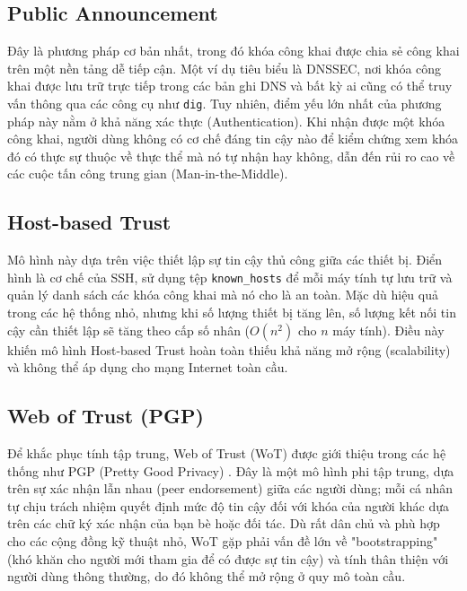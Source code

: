 \subsection{Public Announcement}
Đây là phương pháp cơ bản nhất, trong đó khóa công khai được chia sẻ công khai trên một nền tảng dễ tiếp cận. Một ví dụ tiêu biểu là DNSSEC, nơi khóa công khai được lưu trữ trực tiếp trong các bản ghi DNS và bất kỳ ai cũng có thể truy vấn thông qua các công cụ như \texttt{dig}. Tuy nhiên, điểm yếu lớn nhất của phương pháp này nằm ở khả năng xác thực (Authentication). Khi nhận được một khóa công khai, người dùng không có cơ chế đáng tin cậy nào để kiểm chứng xem khóa đó có thực sự thuộc về thực thể mà nó tự nhận hay không, dẫn đến rủi ro cao về các cuộc tấn công trung gian (Man-in-the-Middle).

\subsection{Host-based Trust}
Mô hình này dựa trên việc thiết lập sự tin cậy thủ công giữa các thiết bị. Điển hình là cơ chế của SSH, sử dụng tệp \texttt{known\_hosts} để mỗi máy tính tự lưu trữ và quản lý danh sách các khóa công khai mà nó cho là an toàn. Mặc dù hiệu quả trong các hệ thống nhỏ, nhưng khi số lượng thiết bị tăng lên, số lượng kết nối tin cậy cần thiết lập sẽ tăng theo cấp số nhân ($O(n^2)$ cho $n$ máy tính). Điều này khiến mô hình Host-based Trust hoàn toàn thiếu khả năng mở rộng (scalability) và không thể áp dụng cho mạng Internet toàn cầu.

\subsection{Web of Trust (PGP)}
Để khắc phục tính tập trung, Web of Trust (WoT) được giới thiệu trong các hệ thống như PGP (Pretty Good Privacy) \cite{Zimmermann1995}. Đây là một mô hình phi tập trung, dựa trên sự xác nhận lẫn nhau (peer endorsement) giữa các người dùng; mỗi cá nhân tự chịu trách nhiệm quyết định mức độ tin cậy đối với khóa của người khác dựa trên các chữ ký xác nhận của bạn bè hoặc đối tác. Dù rất dân chủ và phù hợp cho các cộng đồng kỹ thuật nhỏ, WoT gặp phải vấn đề lớn về "bootstrapping" (khó khăn cho người mới tham gia để có được sự tin cậy) và tính thân thiện với người dùng thông thường, do đó không thể mở rộng ở quy mô toàn cầu.

